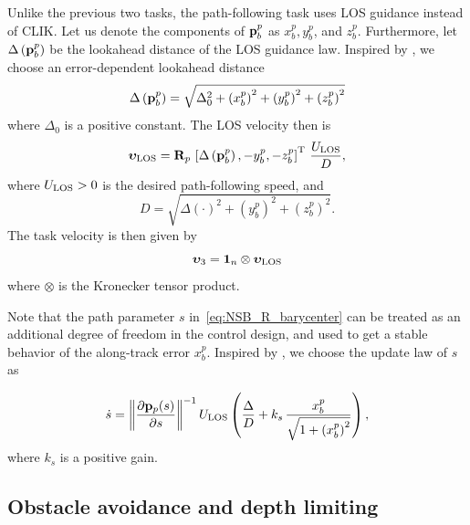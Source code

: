 Unlike the previous two tasks, the path-following task uses LOS guidance instead of CLIK.
Let us denote the components of $\mathbf{p}_b^p$ as $x_b^p, y_b^p$, and $z_b^p$.
Furthermore, let $\Delta\left(\mathbf{p}_b^p\right)$ be the lookahead distance of the LOS guidance law.
Inspired by \cite{belleter_2019_observer}, we choose an error-dependent lookahead distance 
\begin{equation}
    \Delta\left(\mathbf{p}_b^p\right) = \sqrt{\Delta_0^2 + \left(x_b^p\right)^2 + \left(y_b^p\right)^2 + \left(z_b^p\right)^2}
    \label{eq:NSB_R_delta}
\end{equation}
where $\Delta_0$ is a positive constant.
The LOS velocity then is 
\begin{equation}
    \bm{\upsilon}_{\rm LOS} = \mathbf{R}_p\,\left[\Delta\left(\mathbf{p}_b^p\right), -y_b^p, -z_b^p\right]^{\mathrm{T}}\,\frac{U_{\rm LOS}}{D},
    \label{eq:NSB_R_v_LOS}
\end{equation}
where $U_{\rm LOS} > 0$ is the desired path-following speed, and 
\begin{equation}
    D = \sqrt{\Delta(\cdot)^2 + \left(y_b^p\right)^2 + \left(z_b^p\right)^2}.
\end{equation}
The task velocity is then given by 
\begin{equation}
    \bm{\upsilon}_3 = \mathbf{1}_n \otimes \bm{\upsilon}_{\rm LOS}
    \label{eq:NSB_R_v_3}
\end{equation}
where $\otimes$ is the Kronecker tensor product.

Note that the path parameter $s$ in~\eqref{eq:NSB_R_barycenter} can be treated as an additional degree of freedom in the control design, and used to get a stable behavior of the along-track error $x_b^p$. 
Inspired by \cite{belleter_2019_observer}, we choose the update law of $s$ as

\begin{equation}
    \dot{s} = \left\|\frac{\partial \mathbf{p}_p(s)}{\partial s}\right\|^{-1} U_{\rm LOS} \left(\frac{\Delta}{D} + k_{s}\,\frac{x_b^p}{\sqrt{1+\left(x_b^p\right)^2}}\right),\label{eq:NSB_R_path_update}
\end{equation}
where $k_{s}$ is a positive gain.


\subsection{Obstacle avoidance and depth limiting}
\label{sec:NSB_R_OA}

